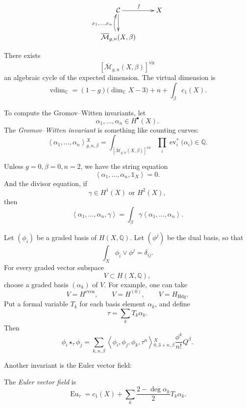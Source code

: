$$
\xymatrix{
\mathcal C \ar[r]^f \ar[d]& X \\
\overline{\mathcal M}_{g,n}(X,\beta)
\ar@/^/[u]^{x_1,\dots,x_n}
}
$$

There exists
\[
[\overline{\mathcal M}_{g,n}(X,\beta)]^{
\mathrm{vir}}
\]
an algebraic cycle of the expected
dimension.
The virtual dimension is
\[
\operatorname{vdim}_{\mathbb{C}}
=
(1-g)\bigl(\dim_{\mathbb{C}}X-3\bigr)
+n
+\int_\beta c_1(X).
\]

\begin{definition}
\label{definition-compute-gromov}
To compute the Gromov--Witten
invariants, let
\[
\alpha_1,\dots,\alpha_n\in H^\bullet(X).
\]
The {\it Gromov--Witten invariant} is
something like counting curves:
\[
\left\langle{}
\alpha_1,\dots,\alpha_n
\right\rangle{}^X_{g,n,\beta}
=
\int_{
[\overline{\mathcal M}_{g,n}(X,\beta)]^{
\mathrm{vir}}
}
\prod_i \operatorname{ev}_i^*
\bigl(\alpha_i\bigr)
\in \mathbb{Q}.
\]

Unless $g=0,\beta=0,n=2$, we have
the string equation
\[
\left\langle{}
\alpha_1,\dots,\alpha_n,\mathbb{1}_X
\right\rangle{}
=0.
\]
And the divisor equation, if
\[
\gamma\in H^1(X)\text{ or }H^2(X),
\]
then
\[
\left\langle{}
\alpha_1,\dots,\alpha_n,\gamma
\right\rangle{}
=
\int_\beta \gamma
\left\langle{}
\alpha_1,\dots,\alpha_n
\right\rangle{}.
\]
\end{definition}

\begin{definition}
\label{definition-let-i}
Let $(\phi_i)$ be a graded basis of
$H(X,\mathbb{Q})$.
Let $(\phi^j)$ be the dual basis, so
that
\[
\int_X \phi_i\vee \phi^j
=
\delta_{ij}.
\]
For every graded vector subspace
\[
V\subset H(X,\mathbb{Q}),
\]
choose a graded basis
$(\alpha_k)$ of $V$.
For example, one can take
\[
V=H^{\mathrm{even}},
\qquad
V=H^{(0)},
\qquad
V=H_{\mathrm{Hdg}}.
\]
Put a formal variable $T_k$ for each
basis element $\alpha_k$, and define
\[
\tau=\sum_k T_k\alpha_k.
\]
Then
\[
\phi_i\star_\tau\phi_j
=
\sum_{k,n,\beta}
\left\langle{}
\phi_i,\phi_j,\phi_k,\tau^n
\right\rangle{}^X_{0,3+n,\beta}
\frac{\phi^k}{n!}Q^\beta .
\]
\end{definition}

\noindent
Another invariant is the Euler vector field:

\begin{definition}
\label{definition-euler-vector}
The {\it Euler vector field} is
\[
\operatorname{Eu}_\tau
=
c_1(X)
+
\sum_k
\frac{2-\deg \alpha_k}{2}
T_k\alpha_k.
\]
\end{definition}

